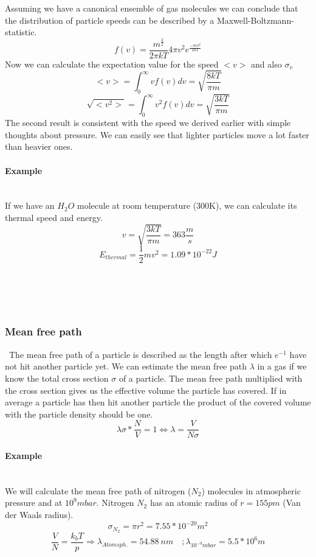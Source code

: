 \documentclass[]{article}
\begin{document}
 Assuming we have a canonical ensemble of gas molecules we can conclude that the distribution of particle speeds can be described by a Maxwell-Boltzmann-statistic. \[ f(v)=\frac{m^{\frac{3}{2}}}{2\pi k T} 4\pi v^{2} e^{\frac{-mv^{2}}{2kT}} \] Now we can calculate the expectation value for the speed $<v>$ and also $\sigma_{v}$
 \[<v>=\int_{0}^{\infty}vf(v)dv=\sqrt{\frac{8kT}{\pi m}}  \]
 \[ \sqrt{<v^{2}>}=\int_{0}^{\infty}v^{2}f(v)dv=\sqrt{\frac{3kT}{\pi m}}  \]
 The second result is consistent with the speed we derived earlier with simple thoughts about pressure. We can easily see that lighter particles move a lot faster than heavier ones. 
 \paragraph{Example}
 \mbox{}\\
 If we have an $H_{2}O$ molecule at room temperature (300K), we can calculate its thermal speed and energy.\[ 
 v=\sqrt{\frac{3kT}{\pi m}}=363\frac{m}{s} \]
 \[ E_{thermal}=\frac{1}{2}mv^{2}=1.09*10^{-22}J \]
\\\\\\\\
\subsubsection{Mean free path}\
The mean free path of a particle is described as the length after which $e^{-1}$ have not hit another particle yet. We can estimate the mean free path $\lambda$ in a gas if we know the total cross section $\sigma$  of a particle. The mean free path multiplied with the cross section gives us the effective volume the particle has covered. If in average a particle has then hit another particle the product of the covered volume with the particle density should be one.\[\lambda \sigma *\frac{N}{V}=1 \Leftrightarrow \lambda=\frac{V}{N\sigma}  \]

\paragraph{Example}\mbox{}\\
We will calculate the mean free path of nitrogen ($N_{2}$) molecules in atmospheric pressure and at $10^{9}mbar$. Nitrogen $N_{2}$ has an atomic radius of $r = 155 pm$ (Van der Waals radius). \[\sigma_{N_{2}}=\pi r^{2}=7.55*10^{-20}m^{2} \]\[ \frac{V}{N}=\frac{k_{b}T}{p} \Rightarrow \lambda_{Atomsph.}=54.88\:nm   \quad ;\lambda_{10^{-9}mbar}=5.5*10^{6}m \]
\end{document}
